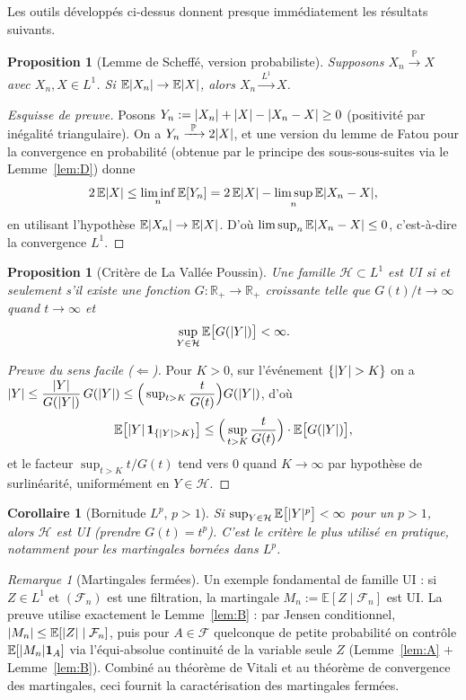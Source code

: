 \documentclass[11pt,a4paper]{article}
\newtheorem{proposition}[theorem]{Proposition}
\newtheorem{corollary}[theorem]{Corollaire}
\theoremstyle{definition}
\theoremstyle{remark}
\newtheorem{remark}[theorem]{Remarque}
\newcommand{\E}{\mathbb{E}}
\newcommand{\PP}{\mathbb{P}}
\newcommand{\R}{\mathbb{R}}
\newcommand{\F}{\mathcal{F}}
\newcommand{\Hf}{\mathcal{H}}
\newcommand{\ind}[1]{\mathbf{1}_{#1}}
\newcommand{\convP}{\xrightarrow{\ \PP\ }}
\newcommand{\convLone}{\xrightarrow{\ L^1\ }}
\DeclarePairedDelimiter{\abs}{\lvert}{\rvert}
\begin{document}
Les outils développés ci-dessus donnent presque immédiatement les résultats
suivants.

\begin{proposition}[Lemme de Scheffé, version probabiliste]
Supposons $X_n \convP X$ avec $X_n, X \in L^1$. Si $\E\abs{X_n} \to \E\abs{X}$,
alors $X_n \convLone X$.
\end{proposition}

\begin{proof}[Esquisse de preuve]
Posons $Y_n := \abs{X_n} + \abs{X} - \abs{X_n - X} \ge 0$ (positivité par
inégalité triangulaire). On a $Y_n \convP 2\abs{X}$, et une version du lemme de
Fatou pour la convergence en probabilité (obtenue par le principe des
sous-sous-suites via le Lemme~\ref{lem:D}) donne
\[
2\,\E\abs{X} \le \liminf_{n} \E[Y_n]
= 2\,\E\abs{X} - \limsup_{n} \E\abs{X_n - X},
\]
en utilisant l'hypothèse $\E\abs{X_n} \to \E\abs{X}$. D'où
$\limsup_n \E\abs{X_n - X} \le 0$, c'est-à-dire la convergence $L^1$.
\end{proof}

\begin{proposition}[Critère de La Vallée Poussin]
Une famille $\Hf \subset L^1$ est UI si et seulement s'il existe une fonction
$G : \R_+ \to \R_+$ croissante telle que $G(t)/t \to \infty$ quand
$t \to \infty$ et
\[
\sup_{Y \in \Hf} \E\big[G(\abs{Y})\big] < \infty.
\]
\end{proposition}

\begin{proof}[Preuve du sens facile ($\Leftarrow$)]
Pour $K > 0$, sur l'événement $\{\abs{Y} > K\}$ on a
$\abs{Y} \le \dfrac{\abs{Y}}{G(\abs{Y})} \, G(\abs{Y})
\le \Big(\sup_{t > K} \dfrac{t}{G(t)}\Big) G(\abs{Y})$, d'où
\[
\E\big[\abs{Y}\,\ind{\{\abs{Y} > K\}}\big]
\le \Big(\sup_{t > K} \frac{t}{G(t)}\Big) \cdot \E\big[G(\abs{Y})\big],
\]
et le facteur $\sup_{t > K} t/G(t)$ tend vers $0$ quand $K \to \infty$ par
hypothèse de surlinéarité, uniformément en $Y \in \Hf$.
\end{proof}

\begin{corollary}[Bornitude $L^p$, $p > 1$]
Si $\sup_{Y \in \Hf} \E\big[\abs{Y}^p\big] < \infty$ pour un $p > 1$, alors
$\Hf$ est UI (prendre $G(t) = t^p$). C'est le critère le plus utilisé en
pratique, notamment pour les martingales bornées dans $L^p$.
\end{corollary}

\begin{remark}[Martingales fermées]
Un exemple fondamental de famille UI : si $Z \in L^1$ et $(\F_n)$ est une
filtration, la martingale $M_n := \E[Z \mid \F_n]$ est UI. La preuve utilise
exactement le Lemme~\ref{lem:B} : par Jensen conditionnel,
$\abs{M_n} \le \E[\abs{Z} \mid \F_n]$, puis pour $A \in \F$ quelconque de petite
probabilité on contrôle $\E[\abs{M_n}\ind{A}]$ via l'équi-absolue continuité de
la variable seule $Z$ (Lemme~\ref{lem:A} $+$ Lemme~\ref{lem:B}). Combiné au
théorème de Vitali et au théorème de convergence des martingales, ceci fournit
la caractérisation des martingales fermées.
\end{remark}
\end{document}
